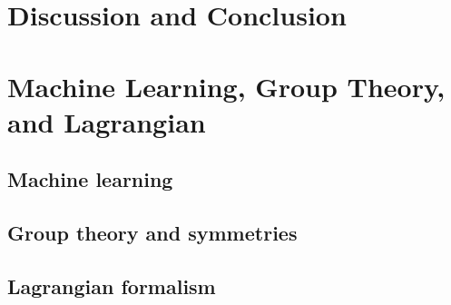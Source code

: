 \section{Discussion and Conclusion}\label{sec:discussion}

\printbibliography
\appendix

\section{Machine Learning, Group Theory, and Lagrangian}
\subsection{Machine learning}

\subsection{Group theory and symmetries}

\subsection{Lagrangian formalism}\label{sec:lagrangian}
\cite{xuLagrangianFormalismQuantum2021}
